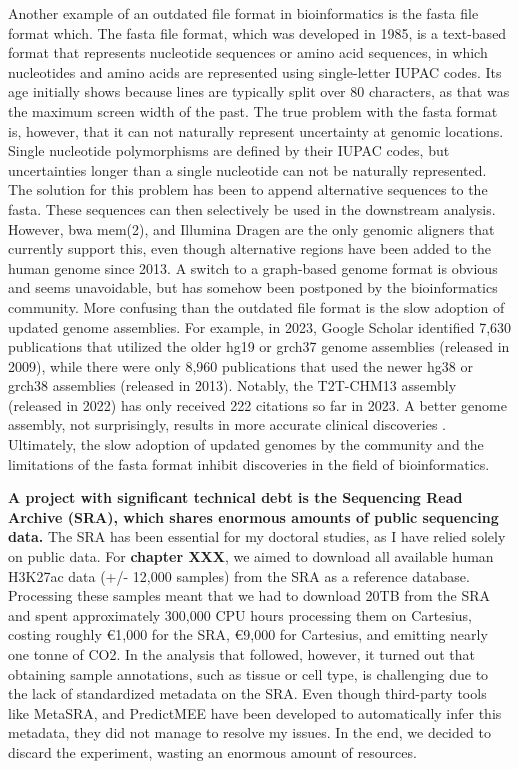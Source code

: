 Another example of an outdated file format in bioinformatics is the fasta file format which\cite{Lipman1985}. The fasta file format, which was developed in 1985, is a text-based format that represents nucleotide sequences or amino acid sequences, in which nucleotides and amino acids are represented using single-letter IUPAC codes. Its age initially shows because lines are typically split over 80 characters, as that was the maximum screen width of the past. The true problem with the fasta format is, however, that it can not naturally represent uncertainty at genomic locations. Single nucleotide polymorphisms are defined by their IUPAC codes, but uncertainties longer than a single nucleotide can not be naturally represented. The solution for this problem has been to append alternative sequences to the fasta. These sequences can then selectively be used in the downstream analysis. However, bwa mem(2)\cite{bwamem,bwamem2}, and Illumina Dragen are the only genomic aligners that currently support this, even though alternative regions have been added to the human genome since 2013. A switch to a graph-based genome format\cite{Li2020} is obvious and seems unavoidable, but has somehow been postponed by the bioinformatics community. More confusing than the outdated file format is the slow adoption of updated genome assemblies. For example, in 2023, Google Scholar identified 7,630 publications that utilized the older hg19 or grch37 genome assemblies (released in 2009), while there were only 8,960 publications that used the newer hg38 or grch38 assemblies (released in 2013). Notably, the T2T-CHM13 assembly (released in 2022) has only received 222 citations so far in 2023. A better genome assembly, not surprisingly, results in more accurate clinical discoveries \cite{Aganezov2022}. Ultimately, the slow adoption of updated genomes by the community and the limitations of the fasta format inhibit discoveries in the field of bioinformatics.

\textbf{A project with significant technical debt is the Sequencing Read Archive (SRA), which shares enormous amounts of public sequencing data.} The SRA has been essential for my doctoral studies, as I have relied solely on public data. For \textbf{chapter XXX}, we aimed to download all available human H3K27ac data (+/- 12,000 samples) from the SRA as a reference database. Processing these samples meant that we had to download 20TB from the SRA and spent approximately 300,000 CPU hours processing them on Cartesius, costing roughly €1,000 for the SRA\cite{amazon}, €9,000 for Cartesius, and emitting nearly one tonne of CO2\cite{CO2}. In the analysis that followed, however, it turned out that obtaining sample annotations, such as tissue or cell type, is challenging due to the lack of standardized metadata on the SRA. Even though third-party tools like MetaSRA\cite{Bernstein2017}, and PredictMEE\cite{Klie2021} have been developed to automatically infer this metadata, they did not manage to resolve my issues. In the end, we decided to discard the experiment, wasting an enormous amount of resources.

